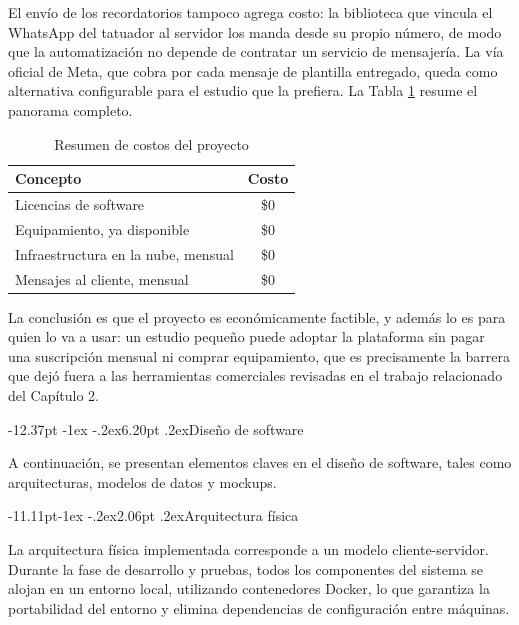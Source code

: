 \documentclass[12pt,letterpaper,oneside]{report}
\makeatletter
\renewcommand\section{\@startsection{section}{1}{\z@}%
  {-12.37pt \@plus -1ex \@minus -.2ex}{6.20pt \@plus.2ex}{\normalfont\large\bfseries}}
\renewcommand\subsection{\@startsection{subsection}{2}{\z@}%
  {-11.11pt\@plus -1ex \@minus -.2ex}{2.06pt \@plus .2ex}{\normalfont\normalsize\bfseries}}
\makeatother
\begin{document}
El envío de los recordatorios tampoco agrega costo: la biblioteca que vincula el WhatsApp del tatuador al servidor los manda desde su propio número, de modo que la automatización no depende de contratar un servicio de mensajería. La vía oficial de Meta, que cobra por cada mensaje de plantilla entregado, queda como alternativa configurable para el estudio que la prefiera. La Tabla \ref{tab:costos} resume el panorama completo.

\begin{table}[H]
  \centering
  \caption{Resumen de costos del proyecto}
  \label{tab:costos}
  \renewcommand{\arraystretch}{1.2}
  \begin{tabular}{|p{8.2cm}|c|}
    \hline
    \textbf{Concepto} & \textbf{Costo} \\
    \hline
    Licencias de software & \$0 \\ \hline
    Equipamiento, ya disponible & \$0 \\ \hline
    Infraestructura en la nube, mensual & \$0 \\ \hline
    Mensajes al cliente, mensual & \$0 \\ \hline
  \end{tabular}
\end{table}

La conclusión es que el proyecto es económicamente factible, y además lo es para quien lo va a usar: un estudio pequeño puede adoptar la plataforma sin pagar una suscripción mensual ni comprar equipamiento, que es precisamente la barrera que dejó fuera a las herramientas comerciales revisadas en el trabajo relacionado del Capítulo 2.

\section{Diseño de software }

A continuación, se presentan elementos claves en el diseño de software, tales como arquitecturas, modelos de datos y mockups.

\subsection{Arquitectura física }

La arquitectura física implementada corresponde a un modelo cliente-servidor. Durante la fase de desarrollo y pruebas, todos los componentes del sistema se alojan en un entorno local, utilizando contenedores Docker, lo que garantiza la portabilidad del entorno y elimina dependencias de configuración entre máquinas.
\end{document}
